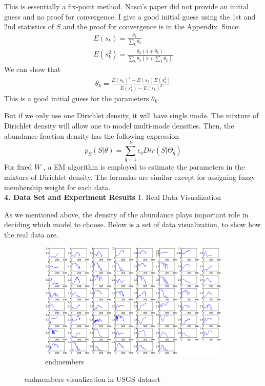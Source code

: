 \documentclass[14pt]{book}
\begin{document}
This is essentially a fix-point method. Nasci's paper did not provide an initial guess and no proof for convergence. 
I give a good initial guess using the 1st and 2nd statistics of $S$ and the proof for convergence is in the Appendix. 
Since:
\begin{equation}
\begin{aligned}
E(s_{k}) = \frac{\theta_k}{\sum_k \theta_k}\\
E(s_{k}^2) = \frac{\theta_k(1+\theta_k)}{\sum_k \theta_k(1+\sum_k \theta_k)}
\end{aligned}
\end{equation}
We can show that 
\begin{equation}
\begin{aligned}
\theta_k = \frac{E(s_{k}) ^2-E(s_{k}) E(s_{k}^2) }{E(s_{k}^2) - E(s_{k}) ^2}
\end{aligned}
\end{equation}
This is a good initial guess for the parameters $\theta_k$.
\par But if we only use one Dirichlet density, it will have single mode. The mixture of Dirichlet density will allow one to model multi-mode densities. Then, the abundance fraction density has the following expression 
\begin{equation}
p_S(S|\theta ) = \sum_{q=1}^k \epsilon _qDir(S|\Theta _q) 
\end{equation}
For fixed $W$ , a EM algorithm is employed to estimate the parameters in the mixture of Dirichlet density.  The formulas  are similar except for assigning fuzzy membership weight for each data. \\
\setcounter{chapter}{4}
\setcounter{equation}{0} %
{\bf 4. Data Set and Experiment Results }
1. Real Data Visualization
\par As we mentioned above, the density of the abundance plays important role in deciding which model to choose. Below is a set of data visualization, to show how the real data are. 
 \begin{figure}
        \centering
        \begin{subfigure}[b]{1.0\textwidth}
                \centering
                \includegraphics[width=\textwidth]{endmembers.eps}
                \caption{endmembers }
                \label{fig:endmembers visualization in USGS dataset}
        \end{subfigure}%

        \caption{endmembers visualization in USGS dataset }\label{fig:animals}
\end{figure}
\end{document}
